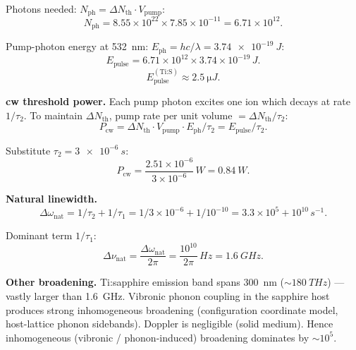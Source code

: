 \documentclass[11pt]{article}
\begin{document}
Photons needed: $N_{\text{ph}} = \Delta N_{\text{th}}\cdot V_{\text{pump}}$:
\[
N_{\text{ph}} = 8.55\times 10^{22}\times 7.85\times 10^{-11} = 6.71\times 10^{12}.
\]

Pump-photon energy at \SI{532}{nm}: $E_{\text{ph}} = hc/\lambda = \SI{3.74e-19}{J}$:
\[
E_{\text{pulse}} = 6.71\times 10^{12}\times 3.74\times 10^{-19}\,\si{J}.
\]
\[
\boxed{\;E_{\text{pulse}}^{(\text{Ti:S})} \approx \SI{2.5}{\micro J}.\;}
\]

\textbf{cw threshold power.} Each pump photon excites one ion which decays at rate $1/\tau_2$. To maintain $\Delta N_{\text{th}}$, pump rate per unit volume $= \Delta N_{\text{th}}/\tau_2$:
\[
P_{\text{cw}} = \Delta N_{\text{th}}\cdot V_{\text{pump}}\cdot E_{\text{ph}}/\tau_2 = E_{\text{pulse}}/\tau_2.
\]

Substitute $\tau_2 = \SI{3e-6}{s}$:
\[
P_{\text{cw}} = \frac{2.51\times 10^{-6}}{3\times 10^{-6}}\,\si{W} = \boxed{\SI{0.84}{W}}.
\]

\textbf{Natural linewidth.}
\[
\Delta\omega_{\text{nat}} = 1/\tau_2 + 1/\tau_1 = 1/3\times 10^{-6} + 1/10^{-10} = 3.3\times 10^5 + 10^{10}\,\si{s^{-1}}.
\]

Dominant term $1/\tau_1$:
\[
\Delta\nu_{\text{nat}} = \frac{\Delta\omega_{\text{nat}}}{2\pi} = \frac{10^{10}}{2\pi}\,\si{Hz} = \boxed{\SI{1.6}{GHz}}.
\]

\textbf{Other broadening.} Ti:sapphire emission band spans \SI{300}{nm} ($\sim\SI{180}{THz}$) --- vastly larger than \SI{1.6}{GHz}. Vibronic phonon coupling in the sapphire host produces strong inhomogeneous broadening (configuration coordinate model, host-lattice phonon sidebands). Doppler is negligible (solid medium). Hence inhomogeneous (vibronic / phonon-induced) broadening dominates by $\sim\!10^5$.
\end{document}
